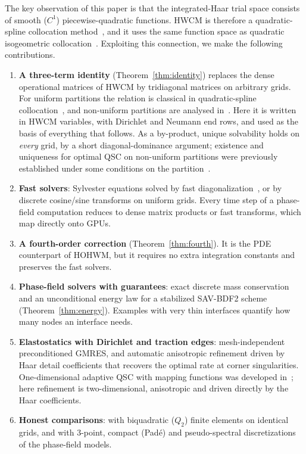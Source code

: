 \documentclass[preprint,12pt]{elsarticle}
\theoremstyle{remark}
\begin{document}
The key observation of this paper is that the integrated-Haar trial space consists of smooth ($C^1$)
piecewise-quadratic functions. HWCM is therefore a quadratic-spline collocation
method~\cite{houstis1988quadratic,christara1994quadratic,christara2006optimal,christara2002fast}, and
it uses the same function space as quadratic isogeometric
collocation~\cite{auricchio2010isogeometric,schillinger2013isogeometric,anitescu2015isogeometric,gomez2016variational}.
Exploiting this connection, we make the following contributions.
\begin{enumerate}
\item \textbf{A three-term identity} (Theorem~\ref{thm:identity}) replaces the dense operational
matrices of HWCM by tridiagonal matrices on arbitrary grids. For uniform partitions the relation is
classical in quadratic-spline collocation~\cite{houstis1988quadratic}, and non-uniform partitions are
analysed in~\cite{christara2006optimal}. Here it is written in HWCM variables, with Dirichlet and Neumann end rows, and used as the basis of
everything that follows. As a by-product, unique solvability holds on \emph{every} grid, by a short
diagonal-dominance argument; existence and uniqueness for optimal QSC on non-uniform partitions were
previously established under some conditions on the partition~\cite{christara2006optimal}.
\item \textbf{Fast solvers}: Sylvester equations solved by fast diagonalization~\cite{lynch1964direct},
or by discrete cosine/sine transforms on uniform grids. Every time step of a phase-field computation
reduces to dense matrix products or fast transforms, which map directly onto GPUs.
\item \textbf{A fourth-order correction} (Theorem~\ref{thm:fourth}). It is the PDE counterpart of
HOHWM, but it requires no extra integration constants and preserves the fast solvers.
\item \textbf{Phase-field solvers with guarantees}: exact discrete mass conservation and an
unconditional energy law for a stabilized SAV-BDF2 scheme (Theorem~\ref{thm:energy}). Examples with
very thin interfaces quantify how many nodes an interface needs.
\item \textbf{Elastostatics with Dirichlet and traction edges}: mesh-independent preconditioned GMRES,
and automatic anisotropic refinement driven by Haar detail coefficients that recovers the optimal rate
at corner singularities. One-dimensional adaptive QSC with mapping functions was developed
in~\cite{christara2006adaptive}; here refinement is two-dimensional, anisotropic and driven directly by
the Haar coefficients.
\item \textbf{Honest comparisons}: with biquadratic ($Q_2$) finite elements on identical grids, and with
3-point, compact (Pad\'e) and pseudo-spectral discretizations of the phase-field models.
\end{enumerate}
\end{document}
